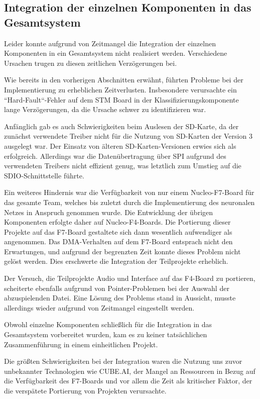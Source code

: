 





\subsection{Integration der einzelnen Komponenten in das Gesamtsystem}
\label{sec:no-gesamtintegration}
\vspace{1em}

Leider konnte aufgrund von Zeitmangel die Integration der einzelnen Komponenten in ein Gesamtsystem nicht realisiert werden. Verschiedene Ursachen trugen zu diesen zeitlichen Verzögerungen bei.

Wie bereits in den vorherigen Abschnitten erwähnt, führten Probleme bei der Implementierung zu erheblichen Zeitverlusten. Insbesondere verursachte ein ``Hard-Fault``-Fehler auf dem STM Board in der Klassifizierungskomponente lange Verzögerungen, da die Ursache schwer zu identifizieren war.

Anfänglich gab es auch Schwierigkeiten beim Auslesen der SD-Karte, da der zunächst verwendete Treiber\cite{spi-sd-card} nicht für die Nutzung von SD-Karten der Version 3 ausgelegt war. Der Einsatz von älteren SD-Karten-Versionen erwies sich als erfolgreich. Allerdings war die Datenübertragung über SPI aufgrund des verwendeten Treibers nicht effizient genug, was letztlich zum Umstieg auf die SDIO-Schnittstelle führte.

Ein weiteres Hindernis war die Verfügbarkeit von nur einem Nucleo-F7-Board für das gesamte Team, welches bis zuletzt durch die Implementierung des neuronalen Netzes in Anspruch genommen wurde. Die Entwicklung der übrigen Komponenten erfolgte daher auf Nucleo-F4-Boards. Die Portierung dieser Projekte auf das F7-Board gestaltete sich dann wesentlich aufwendiger als angenommen. Das DMA-Verhalten auf dem F7-Board entsprach nicht den Erwartungen, und aufgrund der begrenzten Zeit konnte dieses Problem nicht gelöst werden. 
Dies erschwerte die Integration der Teilprojekte erheblich.

Der Versuch, die Teilprojekte Audio und Interface auf das F4-Board zu portieren, scheiterte ebenfalls aufgrund von Pointer-Problemen bei der Auswahl der abzuspielenden Datei. Eine Lösung des Problems stand in Aussicht, musste allerdings wieder aufgrund von Zeitmangel eingestellt werden.

Obwohl einzelne Komponenten schließlich für die Integration in das Gesamtsystem vorbereitet wurden, kam es zu keiner tatsächlichen Zusammenführung in einem einheitlichen Projekt.

Die größten Schwierigkeiten bei der Integration waren die Nutzung uns zuvor unbekannter Technologien wie CUBE.AI, der Mangel an Ressourcen in Bezug auf die Verfügbarkeit des F7-Boards und vor allem die Zeit als kritischer Faktor, der die verspätete Portierung von Projekten verursachte.


